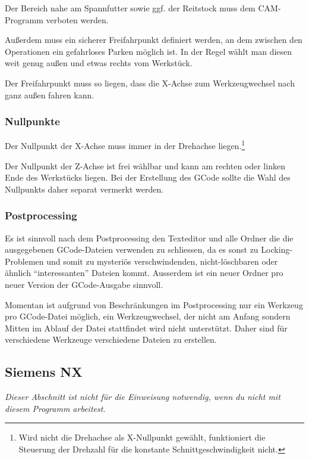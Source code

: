 \documentclass{\basedir/fablab-document}
\begin{document}
Der Bereich nahe am Spannfutter sowie ggf. der Reitstock muss dem CAM-Programm verboten werden.

Außerdem muss ein sicherer Freifahrpunkt definiert werden, an dem zwischen den Operationen ein gefahrloses Parken möglich ist. In der Regel wählt man diesen weit genug außen und etwas rechts vom Werkstück.

Der Freifahrpunkt muss so liegen, dass die X-Achse zum Werkzeugwechsel nach ganz außen fahren kann.

\subsubsection{Nullpunkte} \label{sec:cnc-erstellung.allg.nullpunkte}
Der Nullpunkt der X-Achse muss immer in der Drehachse liegen.\footnote{Wird nicht die Drehachse als X-Nullpunkt gewählt, funktioniert die Steuerung der Drehzahl für die konstante Schnittgeschwindigkeit nicht.}

Der Nullpunkt der Z-Achse ist frei wählbar und kann am rechten oder linken Ende des Werkstücks liegen. Bei der Erstellung des GCode sollte die Wahl des Nullpunkts daher separat vermerkt werden.

\subsubsection{Postprocessing}
Es ist sinnvoll nach dem Postprocessing den Texteditor und alle Ordner die die ausgegebenen
GCode-Dateien verwenden zu schliessen, da es sonst zu Locking-Problemen und
somit zu mysteriös verschwindenden, nicht-löschbaren oder ähnlich
"`interessanten"' Dateien kommt. Ausserdem ist ein neuer Ordner pro neuer
Version der GCode-Ausgabe sinnvoll.

Momentan ist aufgrund von Beschränkungen im Postprocessing nur ein Werkzeug pro GCode-Datei möglich, ein Werkzeugwechsel, der nicht am Anfang sondern Mitten im Ablauf der Datei stattfindet wird nicht unterstützt. Daher sind für verschiedene Werkzeuge verschiedene Dateien zu erstellen.



\subsection{Siemens NX}
\emph{Dieser Abschnitt ist nicht für die Einweisung notwendig, wenn du nicht mit diesem Programm arbeitest.}
\end{document}

